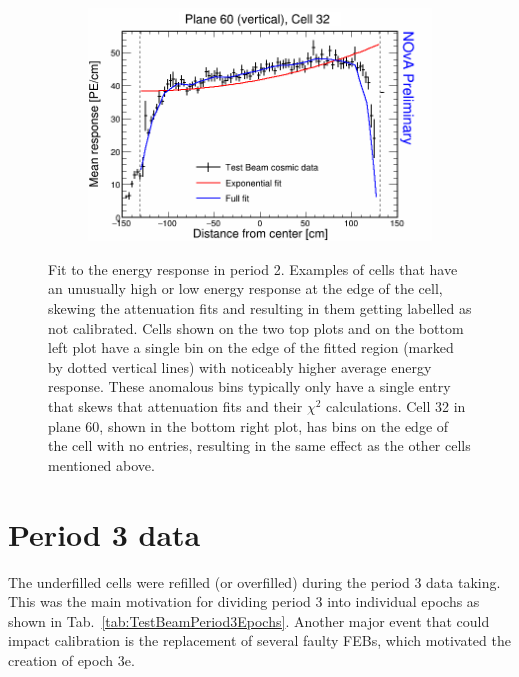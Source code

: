 \begin{figure}[!hbtp]
\begin{subfigure}{0.495\textwidth}
  \end{subfigure}
  \begin{subfigure}{0.495\textwidth}
    \includegraphics[width=\linewidth]{Plots/RelativeCalibrationResults/p2_060_032.png}
  \end{subfigure}
  \caption[Attenuation fits for cells with large fluctuations in period 2 data]{Fit to the energy response in period 2. Examples of cells that have an unusually high or low energy response at the edge of the cell, skewing the attenuation fits and resulting in them getting labelled as not calibrated. Cells shown on the two top plots and on the bottom left plot have a single bin on the edge of the fitted region (marked by dotted vertical lines) with noticeably higher average energy response. These anomalous bins typically only have a single entry that skews that attenuation fits and their $\chi^2$ calculations. Cell 32 in plane 60, shown in the bottom right plot, has bins on the edge of the cell with no entries, resulting in the same effect as the other cells mentioned above.}
  \label{fig:AttenfitResultsPeriod2_CellEdge}
\end{figure}

\section{Period 3 data}\label{sec:TBCalibration_period3}
The underfilled cells were refilled (or overfilled) during the period 3 data taking. This was the main motivation for dividing period 3 into individual epochs as shown in Tab.~\ref{tab:TestBeamPeriod3Epochs}. Another major event that could impact calibration is the replacement of several faulty \glspl{FEB}, which motivated the creation of epoch 3e.

